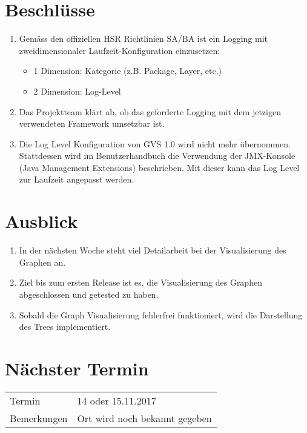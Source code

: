 \documentclass[11pt, a4paper,oneside]{scrartcl}
\begin{document}
\section{Beschlüsse}
\begin{enumerate}
	\item Gemäss den offiziellen HSR Richtlinien SA/BA ist ein Logging mit zweidimensionaler Laufzeit-Konfiguration einzusetzen:
	\begin{itemize}
		\item 1 Dimension: Kategorie (z.B. Package, Layer, etc.)
		\item 2 Dimension: Log-Level
	\end{itemize}
	\item Das Projektteam klärt ab, ob das geforderte Logging mit dem jetzigen verwendeten Framework umsetzbar ist.
	\item Die Log Level Konfiguration von GVS 1.0 wird nicht mehr übernommen. Stattdessen wird im Benutzerhandbuch die Verwendung der JMX-Konsole (Java Management Extensions) beschrieben. Mit dieser kann das Log Level zur Laufzeit angepasst werden.
\end{enumerate} 

\section{Ausblick}
\begin{enumerate}
	\item In der nächsten Woche steht viel Detailarbeit bei der Visualisierung des Graphen an. 
	\item Ziel bis zum ersten Release ist es, die Visualisierung des Graphen abgeschlossen und getested zu haben.
	\item Sobald die Graph Visualisierung fehlerfrei funktioniert, wird die Darstellung des Trees implementiert.
\end{enumerate}

\section{Nächster Termin}
\begin{tabu} to \linewidth {l X }
	\toprule
	Termin & 14 oder 15.11.2017  \\
	Bemerkungen & Ort wird noch bekannt gegeben   \\
	\bottomrule
\end{tabu}
\end{document}
